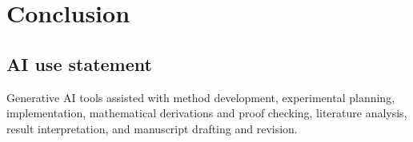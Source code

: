 \documentclass{article}
\begin{document}
\section{Conclusion}

\subsection*{AI use statement}

Generative AI tools assisted with method development, experimental planning,
implementation, mathematical derivations and proof checking, literature
analysis, result interpretation, and manuscript drafting and revision.




\clearpage
\appendix

\end{document}

